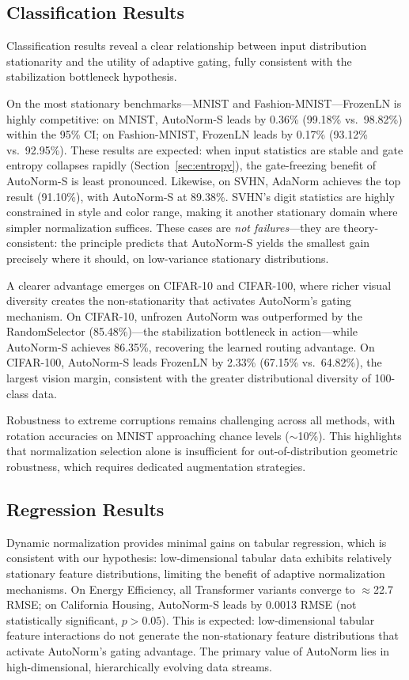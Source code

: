 \documentclass[conference]{IEEEtran}
\begin{document}
\subsection{Classification Results}
\label{sec:bottleneck}

Classification results reveal a clear relationship between input
distribution stationarity and the utility of adaptive gating, fully
consistent with the stabilization bottleneck hypothesis.

On the most stationary benchmarks---MNIST and
Fashion-MNIST---FrozenLN is highly competitive: on MNIST, AutoNorm-S
leads by 0.36\% (99.18\% vs.\ 98.82\%) within the 95\% CI; on
Fashion-MNIST, FrozenLN leads by 0.17\% (93.12\% vs.\ 92.95\%). These
results are expected: when input statistics are stable and gate entropy
collapses rapidly (Section~\ref{sec:entropy}), the gate-freezing
benefit of AutoNorm-S is least pronounced. Likewise, on SVHN, AdaNorm
achieves the top result (91.10\%), with AutoNorm-S at 89.38\%.
SVHN's digit statistics are highly constrained in style and color
range, making it another stationary domain where simpler normalization
suffices. These cases are \textit{not failures}---they are theory-consistent:
the principle predicts that AutoNorm-S yields the smallest gain
precisely where it should, on low-variance stationary distributions.

A clearer advantage emerges on CIFAR-10 and CIFAR-100, where richer
visual diversity creates the non-stationarity that activates AutoNorm's
gating mechanism. On CIFAR-10, unfrozen AutoNorm was outperformed by
the RandomSelector (85.48\%)---the stabilization bottleneck in
action---while AutoNorm-S achieves 86.35\%, recovering the learned
routing advantage. On CIFAR-100, AutoNorm-S leads FrozenLN by 2.33\%
(67.15\% vs.\ 64.82\%), the largest vision margin, consistent with
the greater distributional diversity of 100-class data.

Robustness to extreme corruptions remains challenging across all
methods, with rotation accuracies on MNIST approaching chance levels
($\sim$10\%). This highlights that normalization selection alone is
insufficient for out-of-distribution geometric robustness, which
requires dedicated augmentation strategies.

\subsection{Regression Results}

Dynamic normalization provides minimal gains on tabular regression,
which is consistent with our hypothesis: low-dimensional tabular data
exhibits relatively stationary feature distributions, limiting the
benefit of adaptive normalization mechanisms.
On Energy Efficiency, all Transformer variants converge to
$\approx$22.7 RMSE; on California Housing, AutoNorm-S leads by 0.0013
RMSE (not statistically significant, $p > 0.05$). This is expected:
low-dimensional tabular feature interactions do not generate the
non-stationary feature distributions that activate AutoNorm's gating
advantage. The primary value of AutoNorm lies in high-dimensional,
hierarchically evolving data streams.
\end{document}
